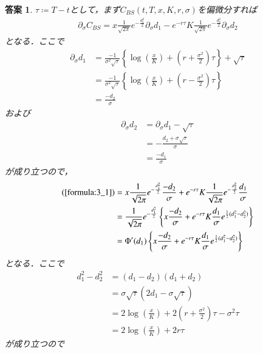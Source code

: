 \documentclass[11pt,a4paper]{jsarticle}
\theoremstyle{mystyle}
\newtheorem*{ans}{答案}
\begin{document}
\begin{ans}
	$\tau \coloneqq T - t$として，まず$C_{BS}(t,T,x,K,r,\sigma)$を偏微分すれば
	\begin{align}
		\partial_{\sigma}C_{BS}
		= x \frac{1}{\sqrt{2\pi}}e^{-\frac{d_{1}^{2}}{2}}\partial_{\sigma}d_{1}
		- e^{-r\tau}K\frac{1}{\sqrt{2\pi}}e^{-\frac{d_{2}^{2}}{2}}\partial_{\sigma}d_{2}
		\label{formula:3_1}
	\end{align}
	となる．ここで
	\begin{align}
		\partial_{\sigma}d_{1} &= \frac{-1}{\sigma^{2}\sqrt{\tau}}
		\left\{\log{\left(\frac{x}{K}\right)}+\left(r+\frac{\sigma^{2}}{2}\right)\tau\right\} + \sqrt{\tau} \\
		&= \frac{-1}{\sigma^{2}\sqrt{\tau}}
		\left\{\log{\left(\frac{x}{K}\right)}+\left(r-\frac{\sigma^{2}}{2}\right)\tau\right\} \\
		&= \frac{-d_{2}}{\sigma}
	\end{align}
	および
	\begin{align}
		\partial_{\sigma}d_{2} &= \partial_{\sigma}d_{1}-\sqrt{\tau} \\
		&= -\frac{d_{2} + \sigma \sqrt{\tau}}{\sigma} \\
		&= \frac{-d_{1}}{\sigma}
	\end{align}
	が成り立つので，
	\begin{align}
		(\refeq{formula:3_1}) &= x \frac{1}{\sqrt{2\pi}}e^{-\frac{d_{1}^{2}}{2}}
		\frac{-d_{2}}{\sigma} + e^{-r\tau}K\frac{1}{\sqrt{2\pi}}e^{-\frac{d_{2}^{2}}{2}}\frac{d_{1}}{\sigma} \\
		&= \frac{1}{\sqrt{2\pi}}e^{-\frac{d_{1}^{2}}{2}}
		\left\{x\frac{-d_{2}}{\sigma} + e^{-r\tau}K\frac{d_{1}}{\sigma}e^{\frac{1}{2}(d_{1}^{2}-d_{2}^{2})}\right\} \\
		&= \Phi'(d_{1}) \left\{x\frac{-d_{2}}{\sigma} + e^{-r\tau}K\frac{d_{1}}{\sigma}e^{\frac{1}{2}(d_{1}^{2}-d_{2}^{2})}\right\}
		\label{formula:3_2}
	\end{align}
	となる．ここで
	\begin{align}
		d_{1}^{2}-d_{2}^{2}
		&= (d_{1}-d_{2})(d_{1}+d_{2}) \\
		&= \sigma \sqrt{\tau}(2d_{1}-\sigma \sqrt{\tau}) \\
		&= 2\log{\left(\frac{x}{K}\right)} + 2\left(r+\frac{\sigma^{2}}{2}\right)\tau
		- \sigma^{2}\tau \\
		&= 2\log{\left(\frac{x}{K}\right)} + 2r\tau
		\label{formula:3_3}
	\end{align}
	が成り立つので
	\begin{align}

\end{align}
\end{ans}
\end{document}
